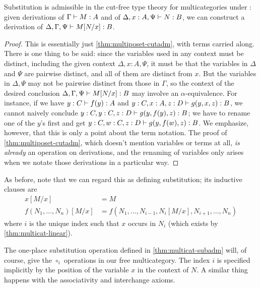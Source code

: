 \begin{thm}\label{thm:multicat-subadm}
  Substitution is admissible in the cut-free type theory for multicategories under \cG: given derivations of $\Gamma\vdash M:A$ and of $\Delta,x:A,\Psi\vdash N:B$, we can construct a derivation of $\Delta,\Gamma,\Psi\vdash M[N/x]:B$.
\end{thm}
\begin{proof}
  This is essentially just \cref{thm:multiposet-cutadm}, with terms carried along.
  There is one thing to be said: since the variables used in any context must be distinct, including the given context $\Delta,x:A,\Psi$, it must be that the variables in $\Delta$ and $\Psi$ are pairwise distinct, and all of them are distinct from $x$.
  But the variables in $\Delta,\Psi$ may not be pairwise distinct from those in $\Gamma$, so the context of the desired conclusion $\Delta,\Gamma,\Psi\vdash M[N/x]:B$ may involve an $\alpha$-equivalence.
  For instance, if we have $y:C\vdash f(y):A$ and $y:C,x:A,z:D\vdash g(y,x,z):B$, we cannot naively conclude $y:C,y:C,z:D\vdash g(y,f(y),z):B$; we have to rename one of the $y$'s first and get $y:C,w:C,z:D\vdash g(y,f(w),z):B$.
  We emphasize, however, that this is only a point about the term notation.
  The proof of \cref{thm:multiposet-cutadm}, which doesn't mention variables or terms at all, \emph{is already} an operation on derivations, and the renaming of variables only arises when we notate those derivations in a particular way.
\end{proof}

As before, note that we can regard this as defining substitution; its inductive clauses are
\begin{align*}
  x[M/x] &= M\\
  f(N_1,\dots,N_n)[M/x] &= f(N_1,\dots,N_{i-1},N_i[M/x],N_{i+1},\dots,N_n)
\end{align*}
where $i$ is the unique index such that $x$ occurs in $N_i$ (which exists by \cref{thm:multicat-linear}).

The one-place substitution operation defined in \cref{thm:multicat-subadm} will, of course, give the $\circ_i$ operations in our free multicategory.
The index $i$ is specified implicitly by the position of the variable $x$ in the context of $N$.
A similar thing happens with the associativity and interchange axioms.

